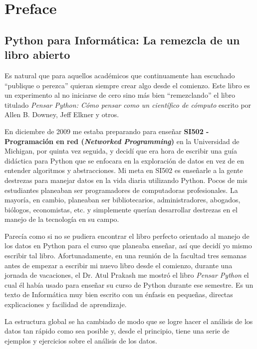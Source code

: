 
\chapter{Preface}

\section*{Python para Inform\'atica: La remezcla de un libro abierto}

Es natural que para aquellos acad\'emicos que continuamente han escuchado ``publique o perezca'' quieran siempre crear algo desde el comienzo. Este libro es  un 
experimento al no iniciarse de cero sino m\'as bien ``remezclando''
el libro titulado
\emph{Pensar Python: C\'omo pensar como un cient\'ifico de c\'omputo}
escrito por Allen B. Downey, Jeff Elkner y otros.

En diciembre de 2009 me estaba preparando para ense\~nar
{\bf SI502 - Programaci\'on en red (\textit{Networked Programming})} en la Universidad de Michigan,
por quinta vez seguida, y decid\'i que era hora de escribir una gu\'ia did\'actica para Python que se enfocara en la exploraci\'on de datos en vez de en entender algoritmos y abstracciones.
Mi meta en SI502 es ense\~narle a la gente destrezas para manejar datos en la vida diaria utilizando Python. Pocos de mis estudiantes planeaban ser programadores de computadoras profesionales. La mayor\'ia, en cambio, planeaban ser bibliotecarios, administradores, abogados, bi\'ologos, economistas, etc. y simplemente quer\'ian desarrollar destrezas en el manejo de la tecnolog\'ia en su campo.

Parec\'ia como si no se pudiera encontrar el libro perfecto orientado al manejo de los datos en Python para el curso que planeaba ense\~nar, as\'i que decid\'i yo mismo escribir tal libro. 
Afortunadamente, en una reuni\'on de la facultad tres semanas antes de empezar a escribir mi nuevo libro desde el comienzo, durante una jornada de vacaciones, el Dr. Atul Prakash me mostr\'o el libro \emph{Pensar Python} el cual \'el hab\'ia usado para ense\~nar su curso de Python durante ese semestre.  
Es un texto de Inform\'atica muy bien escrito con un \'enfasis en peque\~nas, directas explicaciones y facilidad de aprendizaje.  

La estructura global se ha cambiado de modo que se logre hacer el an\'alisis de los datos tan r\'apido como sea posible y, desde el principio, tiene una serie de ejemplos y ejercicios sobre el an\'alisis de los datos.

